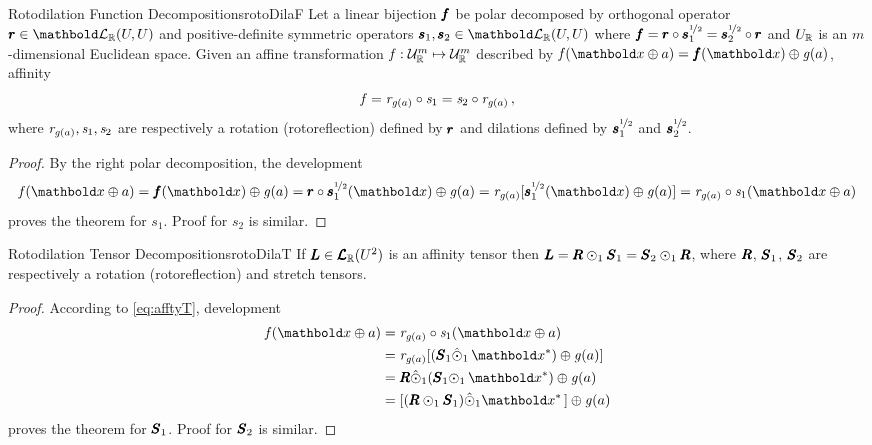\begin{mteo}{Rotodilation Function Decompositions}{rotoDilaF}
Let a linear bijection $\vtf{f}$ be polar decomposed by orthogonal operator $\vtf{r}\in\evl{\real}{U}{U}$ and positive-definite symmetric operators $\vtf{s}_1,\vtf{s}_2\in\evl{\real}{U}{U}$ where $\vtf{f}=\vtf{r}\circ\vtf{s}_1^{\nicefrac{1}{2}}=\vtf{s}_2^{\nicefrac{1}{2}}\circ\vtf{r}$ and $U_\real$ is an $m$-dimensional Euclidean space. Given an affine transformation $\map{\mathit{f}}{\eamd{U}{R}{m}}{\eamd{U}{R}{m}}$ described by $\fua{\mathit{f}}{\vto{x}\oplus a}=\fua{\vtf{f}}{\vto{x}}\oplus\fua{\mathit{g}}{a}$, affinity
\begin{equation*}
\mathit{f} = \mathit{r}_{\fua{\mathit{g}}{a}}\circ\mathit{s}_1=\mathit{s}_2\circ\mathit{r}_{\fua{\mathit{g}}{a}}\,,
\end{equation*}
where $\mathit{r}_{\fua{\mathit{g}}{a}},\mathit{s}_1,\mathit{s}_2$ are respectively a rotation (rotoreflection) defined by $\vtf{r}$ and dilations defined by $\vtf{s}_1^{\nicefrac{1}{2}}$ and $\vtf{s}_2^{\nicefrac{1}{2}}$.  
\end{mteo}

{\footnotesize
\begin{proof}
By the right polar decomposition, the development 
\begin{equation*}
\fua{\mathit{f}}{\vto{x}\oplus a}=\fua{\vtf{f}}{\vto{x}}\oplus \fua{\mathit{g}}{a}=\fua{\vtf{r}\circ\vtf{s}_1^{\nicefrac{1}{2}}}{\vto{x}}\oplus \fua{\mathit{g}}{a}=\mathit{r}_{\fua{\mathit{g}}{a}}[\fua{\vtf{s}_1^{\nicefrac{1}{2}}}{\vto{x}}\oplus \fua{\mathit{g}}{a}]=\mathit{r}_{\fua{\mathit{g}}{a}}\circ\mathit{s}_1(\vto{x}\oplus a) 
\end{equation*}
proves the theorem for $\mathit{s}_1$. Proof for $\mathit{s}_2$ is similar.
\end{proof}}


\begin{mcoro}{Rotodilation Tensor Decompositions}{rotoDilaT}
If $\tnr{L}\in\ete{\cam{R}}{U^2}$ is an affinity tensor then $\tnr{L}=\tnr{R}\odot_1\tnr{S}_1=\tnr{S}_2\odot_1\tnr{R}$, where $\tnr{R}$, $\tnr{S}_1$, $\tnr{S}_2$ are respectively a rotation (rotoreflection) and stretch tensors. 
\end{mcoro}


{\footnotesize
\begin{proof}
According to \eqref{eq:afftyT}, development
\begin{align*}
\fua{\mathit{f}}{\vto{x}\oplus a}&=\mathit{r}_{\fua{\mathit{g}}{a}}\circ\mathit{s}_1(\vto{x}\oplus a)\\
&=\mathit{r}_{\fua{\mathit{g}}{a}}[(\tnr{S}_1\hat{\odot}_1\,\vto{x}^*)\oplus{\fua{\mathit{g}}{a}}]\\
&=\tnr{R}\hat{\odot}_1(\tnr{S}_1{\odot}_1\,\vto{x}^*)\oplus{\fua{\mathit{g}}{a}}\\
&=[(\tnr{R}\odot_1\tnr{S}_1){\hat{\odot}_1\vto{x}^*}\,]\oplus{\fua{\mathit{g}}{a}}
\end{align*}
proves the theorem for $\tnr{S}_1$. Proof for $\tnr{S}_2$ is similar.
\end{proof}}



